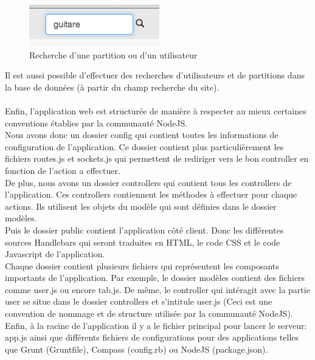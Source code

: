 \begin{figure}[H]
\centering
\includegraphics[scale=1]{rechercheWeb}
\caption{Recherche d'une partition ou d'un utilisateur}
\end{figure}
Il est aussi possible d'effectuer des recherches d'utilisateurs et de partitions dans la base de données (à partir du champ recherche du site).
\paragraph{}
Enfin, l'application web est structurée de manière à respecter au mieux certaines conventions établies par la communauté NodeJS. \\
Nous avons donc un dossier config qui contient toutes les informations de configuration de l'application. Ce dossier contient plus particulièrement les fichiers routes.js et sockets.js qui permettent de rediriger vers le bon controller en fonction de l'action a effectuer. \\
De plus, nous avons un dossier controllers qui contient tous les controllers de l'application. Ces controllers contiennent les méthodes à effectuer pour chaque actions. Ils utilisent les objets du modèle qui sont définies dans le dossier modèles. \\
Puis le dossier public contient l'application côté client. Donc les différentes sources Handlebars qui seront traduites en HTML, le code CSS et le code Javascript de l'application. \\
Chaque dossier contient plusieurs fichiers qui représentent les composants importants de l'application. Par exemple, le dossier modèles contient des fichiers comme user.js ou encore tab.js. De même, le controller qui intéragit avec la partie user se situe dans le dossier controllers et s'intitule user.js (Ceci est une convention de nommage et de structure utilisée par la communauté NodeJS). \\
Enfin, à la racine de l'application il y a le fichier principal pour lancer le serveur: app.js ainsi que différents fichiers de configurations pour des applications telles que Grunt (Gruntfile), Compass (config.rb) ou NodeJS (package.json). \\

